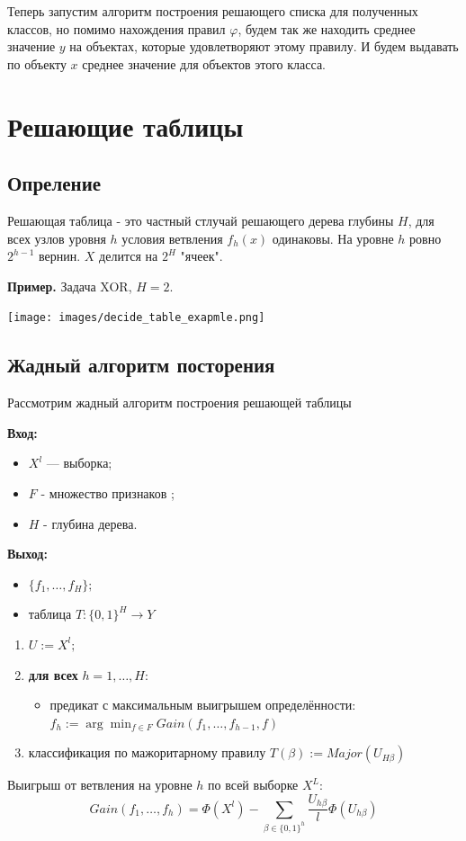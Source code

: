 Теперь запустим алгоритм построения решающего списка для полученных классов, 
но помимо нахождения правил $\varphi$, будем так же находить среднее значение $y$ на объектах, которые удовлетворяют этому правилу.
И будем выдавать по объекту $x$ среднее значение для объектов этого класса.

\section {Решающие таблицы}
\subsection{Опреление}

Решающая таблица - это частный стлучай решающего дерева глубины $H$, для всех узлов уровня $h$ условия ветвления $f_h(x)$ одинаковы. На уровне $h$ ровно $2^{h-1}$ вернин. $X$ делится на $2^H$ "ячеек".

\textbf{Пример.} Задача XOR, $H = 2$.

    \texttt{[image: images/decide\_table\_exapmle.png]}

\subsection{Жадный алгоритм посторения}
Рассмотрим жадный алгоритм построения решающей таблицы

\hline
\textbf{Вход:}
\begin{itemize}
    \item $X^l$ — выборка;
    \item $F$ - множество признаков ;
    \item $H$ - глубина дерева.
\end{itemize}

\textbf{Выход:}
\begin{itemize}
    \item $\{f_1, \dots, f_H\};$ 
    \item таблица $T: \{0, 1\}^H \xrightarrow{} Y$
\end{itemize}

\hline
\begin{enumerate}
    \item $U := X^l;$
    \item \textbf{для всех} $h = 1, \dots, H$:
    \begin{itemize}
        \item предикат с максимальным выигрышем определённости:
        $f_h := \arg\min_{f \in F} Gain(f_1, \dots, f_{h-1}, f)$
    \end{itemize}
    \item классификация по мажоритарному правилу 
    $ T(\beta) := Major(U_{H\beta}) $
\end{enumerate}
\hline
Выигрыш от ветвления на уровне $h$ по всей выборке $X^L$:
$$Gain(f_1, \dots, f_h) = \Phi(X^l) - \sum_{\beta\in \{0, 1\}^h} \frac{U_{h\beta}}{l}\Phi(U_{h\beta})$$

